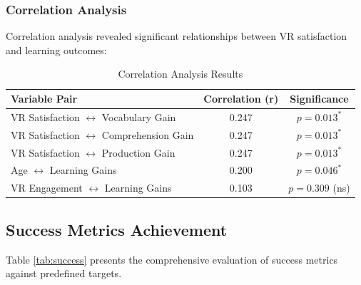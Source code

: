 \documentclass[12pt,a4paper]{article}
\begin{document}
\subsubsection{Correlation Analysis}

Correlation analysis revealed significant relationships between VR satisfaction and learning outcomes:

\begin{table}[H]
\centering
\caption{Correlation Analysis Results}
\begin{tabular}{lcc}
\toprule
\textbf{Variable Pair} & \textbf{Correlation (r)} & \textbf{Significance} \\
\midrule
VR Satisfaction $\leftrightarrow$ Vocabulary Gain & 0.247 & $p = 0.013^*$ \\
VR Satisfaction $\leftrightarrow$ Comprehension Gain & 0.247 & $p = 0.013^*$ \\
VR Satisfaction $\leftrightarrow$ Production Gain & 0.247 & $p = 0.013^*$ \\
Age $\leftrightarrow$ Learning Gains & 0.200 & $p = 0.046^*$ \\
VR Engagement $\leftrightarrow$ Learning Gains & 0.103 & $p = 0.309$ (ns) \\
\bottomrule
\end{tabular}
\end{table}

\subsection{Success Metrics Achievement}

Table \ref{tab:success} presents the comprehensive evaluation of success metrics against predefined targets.
\end{document}
